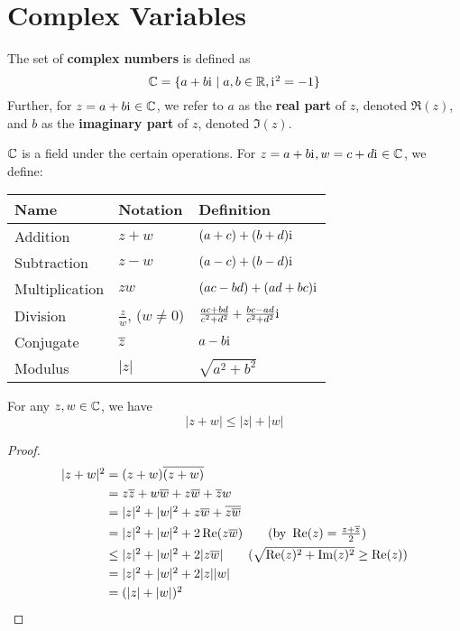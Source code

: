 \section{Complex Variables}

\begin{definition}
    The set of \textbf{complex numbers} is defined as
    \[
        \C = \set{a+b\iu\mid a,b\in\R, \iu^2=-1}
    \]
    Further, for $z=a+b\mathrm{i}\mkern1mu\in\mathbb{C}$, we refer to $a$ as the \textbf{real part} of $z$, denoted $\Re(z)$,
    and $b$ as the \textbf{imaginary part} of $z$, denoted $\Im(z)$.
\end{definition}

\begin{definition}
    $\mathbb{C}$ is a field under the certain operations. For $z=a+b\mathrm{i}\mkern1mu, w=c+d\mathrm{i}\mkern1mu\in\mathbb{C}$,
    we define:
    \begin{table}[H]
        \centering
        \begin{tabular}{lll}
            \textbf{Name} & \textbf{Notation} & \textbf{Definition} \\
            \hline
            Addition & $z+w$ & $(a+c) + (b+d)\mathrm{i}\mkern1mu$ \\
            Subtraction & $z-w$ & $(a-c) + (b-d)\mathrm{i}\mkern1mu$ \\
            Multiplication & $zw$ & $(ac - bd) + (ad + bc)\mathrm{i}\mkern1mu$ \\
            Division & $\displaystyle\frac{z}{w}$, ($w\neq 0$) & $\textstyle\frac{ac + bd}{c^2 + d^2} + \frac{bc - ad}{c^2 + d^2}\mathrm{i}\mkern1mu$ \\
            Conjugate & $\overline{z}$ & $a - b\mathrm{i}\mkern1mu$\\
            Modulus & $|z|$ & $\sqrt{a^2 + b^2}$
        \end{tabular}
    \end{table}
\end{definition}

\begin{theorem}
    For any $z,w\in\mathbb{C}$, we have
    \[
        |z+w| \leq |z| + |w|
    \]
    \begin{proof}
        \begin{align*}
            |z+w|^2 &= (z+w)\conj{(z+w)} \\
            &= z\conj{z} + w\conj{w} + z\conj{w} + \conj{z}w \\
            &= |z|^2 + |w|^2 + z\conj{w} + \conj{z\conj{w}} \\
            &= |z|^2 + |w|^2 + 2\Re(z\conj{w}) \qquad (\text{by }\Re(z) = \frac{z+\conj{z}}{2}) \\
            &\leq |z|^2 + |w|^2 + 2|z\conj{w}| \qquad (\sqrt{\Re(z)^2+\Im(z)^2}\geq \Re(z)) \\
            &= |z|^2 + |w|^2 + 2|z||w| \\
            &= (|z| + |w|)^2
        \end{align*}
    \end{proof}
\end{theorem}

